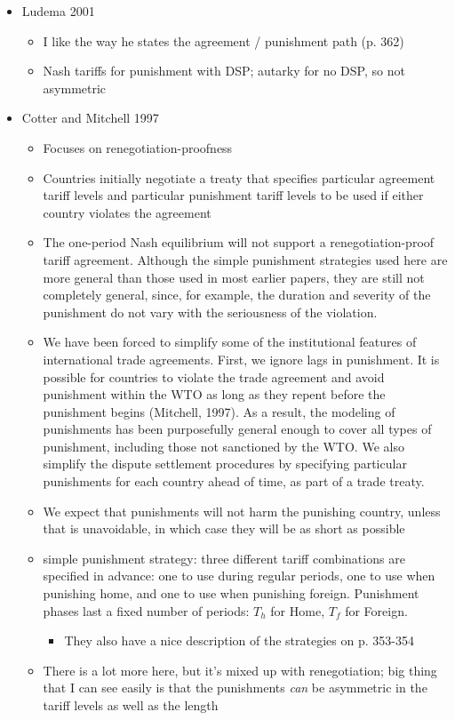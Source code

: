 \documentclass[12pt]{article}
\begin{document}
\begin{itemize}
\begin{itemize}
\begin{itemize}
\begin{itemize}
						\end{itemize}
				\end{itemize}
			\item Ludema 2001
				\begin{itemize}
					\item I like the way he states the agreement / punishment path (p. 362)
					\item Nash tariffs for punishment with DSP; autarky for no DSP, so not asymmetric
				\end{itemize}
			\item Cotter and Mitchell 1997
				\begin{itemize}
					\item Focuses on renegotiation-proofness
					\item Countries initially negotiate a treaty that specifies particular agreement tariff levels and particular punishment tariff levels to be used if either country violates the agreement
					\item The one-period Nash equilibrium will not support a renegotiation-proof tariff agreement. Although the simple punishment strategies used here are more general than those used in most earlier papers, they are still not completely general, since, for example, the duration and severity of the punishment do not vary with the seriousness of the violation.
					\item We have been forced to simplify some of the institutional features of international trade agreements. First, we ignore lags in punishment. It is possible for countries to violate the trade agreement and avoid punishment within the WTO as long as they repent before the punishment begins (Mitchell, 1997). As a result, the modeling of punishments has been purposefully general enough to cover all types of punishment, including those not sanctioned by the WTO. We also simplify the dispute settlement procedures by specifying particular punishments for each country ahead of time, as part of a trade treaty.
					\item We expect that punishments will not harm the punishing country, unless that is unavoidable, in which case they will be as short as possible
					\item simple punishment strategy: three different tariff combinations are specified in advance: one to use during regular periods, one to use when punishing home, and one to use when punishing foreign. Punishment phases last a fixed number of periods: $T_h$ for Home, $T_f$ for Foreign.
						\begin{itemize}
							\item They also have a nice description of the strategies on p. 353-354
						\end{itemize}
					\item There is a lot more here, but it's mixed up with renegotiation; big thing that I can see easily is that the punishments \textit{can} be asymmetric in the tariff levels as well as the length
				\end{itemize}
		\end{itemize}
	\end{itemize}	
\end{document}
